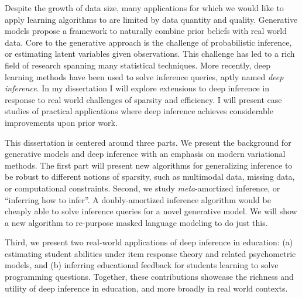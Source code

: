 Despite the growth of data size, many applications for which we would like to apply learning algorithms to are limited by data quantity and quality. Generative models propose a framework to naturally combine prior beliefs with real world data. Core to the generative approach is the challenge of probabilistic inference, or estimating latent variables given observations. This challenge has led to a rich field of research spanning many statistical techniques. More recently, deep learning methods have been used to solve inference queries, aptly named \textit{deep inference}. In my dissertation I will explore extensions to deep inference in response to real world challenges of sparsity and efficiency. I will present case studies of practical applications where deep inference achieves considerable improvements upon prior work.

This dissertation is centered around three parts. We  present the background for generative models and deep inference with an emphasis on modern variational methods. The first part will present new algorithms for generalizing inference to be robust to different notions of sparsity, such as multimodal data, missing data, or computational constraints. Second, we study \textit{meta}-amortized inference, or ``inferring how to infer''. A doubly-amortized inference algorithm would be cheaply able to solve inference queries for a novel generative model. We will show a new algorithm to re-purpose masked language modeling to do just this.

Third, we present two real-world applications of deep inference in education: (a) estimating student abilities under item response theory and related psychometric models, and (b) inferring educational feedback for students learning to solve programming questions. Together, these contributions showcase the richness and utility of deep inference in education, and more broadly in real world contexts.